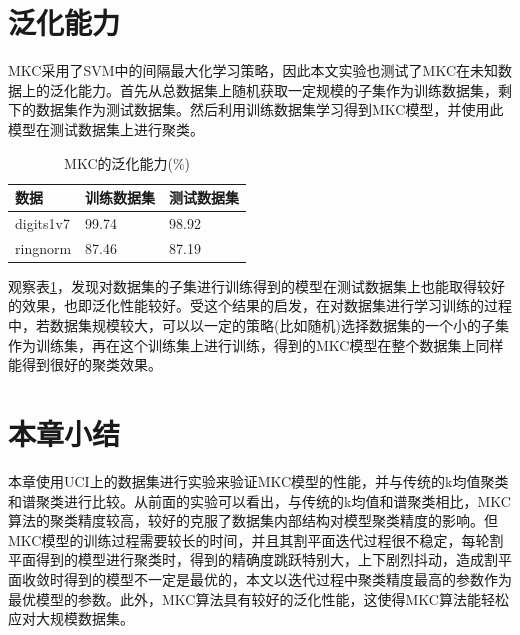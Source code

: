 \section{泛化能力}
MKC采用了SVM中的间隔最大化学习策略，因此本文实验也测试了MKC在未知数据上的泛化能力。首先从总数据集上随机获取一定规模的子集作为训练数据集，剩下的数据集作为测试数据集。然后利用训练数据集学习得到MKC模型，并使用此模型在测试数据集上进行聚类。
\begin{table}[!htbp]
\caption{MKC的泛化能力(\%)}
\centering
\small
\renewcommand\arraystretch{1.5}
\begin{tabular}{|p{2cm}<{\centering}|p{2.5cm}<{\centering}|p{2.5cm}<{\centering}|}
\hline
数据 & 训练数据集 & 测试数据集 \\
\hline
digits1v7 & 99.74 & 98.92 \\
\hline
ringnorm & 87.46 & 87.19  \\
\hline
\end{tabular}
\label{tab:generalize}
\end{table} 

观察表\ref{tab:generalize}，发现对数据集的子集进行训练得到的模型在测试数据集上也能取得较好的效果，也即泛化性能较好。受这个结果的启发，在对数据集进行学习训练的过程中，若数据集规模较大，可以以一定的策略(比如随机)选择数据集的一个小的子集作为训练集，再在这个训练集上进行训练，得到的MKC模型在整个数据集上同样能得到很好的聚类效果。

\section{本章小结}
本章使用UCI上的数据集进行实验来验证MKC模型的性能，并与传统的k均值聚类和谱聚类进行比较。从前面的实验可以看出，与传统的k均值和谱聚类相比，MKC算法的聚类精度较高，较好的克服了数据集内部结构对模型聚类精度的影响。但MKC模型的训练过程需要较长的时间，并且其割平面迭代过程很不稳定，每轮割平面得到的模型进行聚类时，得到的精确度跳跃特别大，上下剧烈抖动，造成割平面收敛时得到的模型不一定是最优的，本文以迭代过程中聚类精度最高的参数作为最优模型的参数。此外，MKC算法具有较好的泛化性能，这使得MKC算法能轻松应对大规模数据集。
